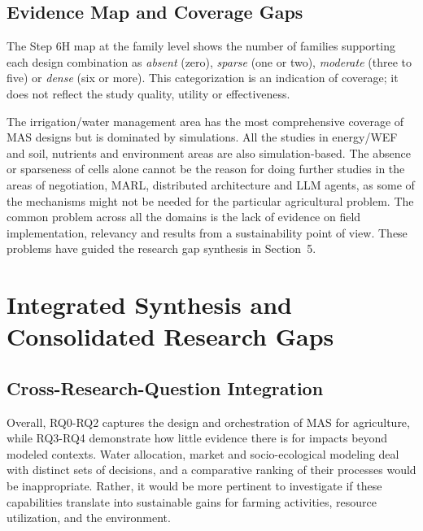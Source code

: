 \documentclass[11pt,a4paper]{article}
\begin{document}
\subsection{Evidence Map and Coverage Gaps}

The Step 6H map at the family level shows the number of families supporting each design combination as \emph{absent} (zero), \emph{sparse} (one or two), \emph{moderate} (three to five) or \emph{dense} (six or more). This categorization is an indication of coverage; it does not reflect the study quality, utility or effectiveness.

The irrigation/water management area has the most comprehensive coverage
of MAS designs but is dominated by simulations. All the studies in
energy/WEF and soil, nutrients and environment areas are also simulation-based.
The absence or sparseness of cells alone cannot be the reason for doing
further studies in the areas of negotiation, MARL, distributed architecture and LLM agents, as some of the mechanisms might not be needed for the particular agricultural problem. The common problem across all the domains is the lack of evidence on field implementation, relevancy and results from a sustainability point of view. These problems have guided the research gap synthesis in Section~5.




\section{Integrated Synthesis and Consolidated Research Gaps}
\label{sec:integrated_synthesis}

\subsection{Cross-Research-Question Integration}

Overall, RQ0-RQ2 captures the design and orchestration of MAS for agriculture, while RQ3-RQ4 demonstrate how little evidence there is for impacts beyond modeled contexts. Water allocation, market and socio-ecological modeling deal with distinct sets of decisions, and a comparative ranking of their processes would be inappropriate. Rather, it would be more pertinent to investigate if these capabilities translate into sustainable gains for farming activities, resource utilization, and the environment.
\end{document}

